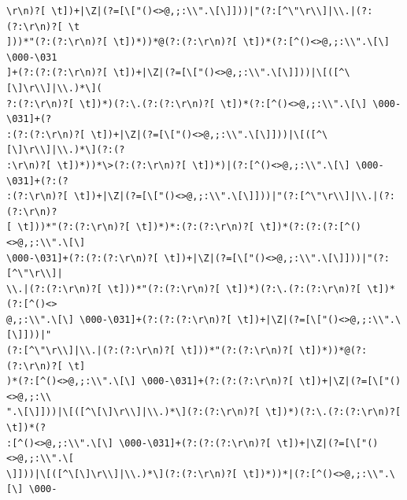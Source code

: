 \documentclass{beamer}
\begin{document}
\begin{frame}[fragile]
\begingroup
 \fontsize{6pt}{8pt}\selectfont
\begin{verbatim}
\r\n)?[ \t])+|\Z|(?=[\["()<>@,;:\\".\[\]]))|"(?:[^\"\r\\]|\\.|(?:(?:\r\n)?[ \t
]))*"(?:(?:\r\n)?[ \t])*))*@(?:(?:\r\n)?[ \t])*(?:[^()<>@,;:\\".\[\] \000-\031
]+(?:(?:(?:\r\n)?[ \t])+|\Z|(?=[\["()<>@,;:\\".\[\]]))|\[([^\[\]\r\\]|\\.)*\](
?:(?:\r\n)?[ \t])*)(?:\.(?:(?:\r\n)?[ \t])*(?:[^()<>@,;:\\".\[\] \000-\031]+(?
:(?:(?:\r\n)?[ \t])+|\Z|(?=[\["()<>@,;:\\".\[\]]))|\[([^\[\]\r\\]|\\.)*\](?:(?
:\r\n)?[ \t])*))*\>(?:(?:\r\n)?[ \t])*)|(?:[^()<>@,;:\\".\[\] \000-\031]+(?:(?
:(?:\r\n)?[ \t])+|\Z|(?=[\["()<>@,;:\\".\[\]]))|"(?:[^\"\r\\]|\\.|(?:(?:\r\n)?
[ \t]))*"(?:(?:\r\n)?[ \t])*)*:(?:(?:\r\n)?[ \t])*(?:(?:(?:[^()<>@,;:\\".\[\]
\000-\031]+(?:(?:(?:\r\n)?[ \t])+|\Z|(?=[\["()<>@,;:\\".\[\]]))|"(?:[^\"\r\\]|
\\.|(?:(?:\r\n)?[ \t]))*"(?:(?:\r\n)?[ \t])*)(?:\.(?:(?:\r\n)?[ \t])*(?:[^()<>
@,;:\\".\[\] \000-\031]+(?:(?:(?:\r\n)?[ \t])+|\Z|(?=[\["()<>@,;:\\".\[\]]))|"
(?:[^\"\r\\]|\\.|(?:(?:\r\n)?[ \t]))*"(?:(?:\r\n)?[ \t])*))*@(?:(?:\r\n)?[ \t]
)*(?:[^()<>@,;:\\".\[\] \000-\031]+(?:(?:(?:\r\n)?[ \t])+|\Z|(?=[\["()<>@,;:\\
".\[\]]))|\[([^\[\]\r\\]|\\.)*\](?:(?:\r\n)?[ \t])*)(?:\.(?:(?:\r\n)?[ \t])*(?
:[^()<>@,;:\\".\[\] \000-\031]+(?:(?:(?:\r\n)?[ \t])+|\Z|(?=[\["()<>@,;:\\".\[
\]]))|\[([^\[\]\r\\]|\\.)*\](?:(?:\r\n)?[ \t])*))*|(?:[^()<>@,;:\\".\[\] \000-

\end{verbatim}
\end{frame}
\end{document}
